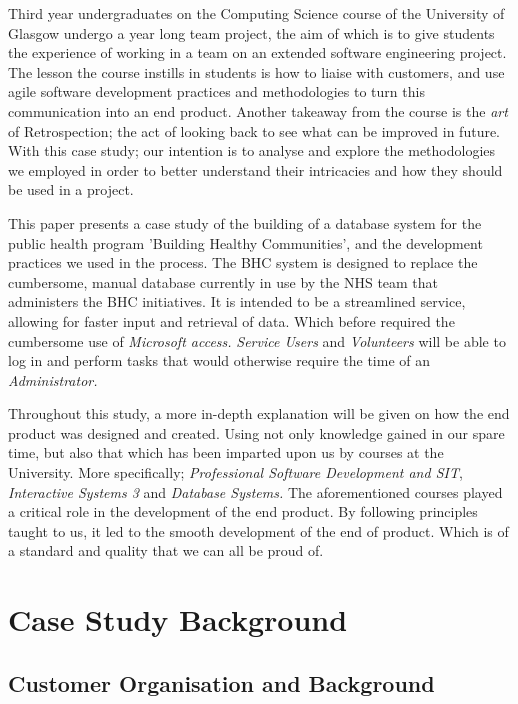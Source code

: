 \documentclass{l3proj}
\begin{document}
Third year undergraduates on the Computing Science course of the University of Glasgow undergo a year long team project, the aim of which is to give students the experience of working in a team on an extended software engineering project. The lesson the course instills in students is how to liaise with customers, and use agile software development practices and methodologies to turn this communication into an end product. Another takeaway from the course is the \textit{art} of Retrospection; the act of looking back to see what can be improved in future. With this case study; our intention is to analyse and explore the methodologies we employed in order to better understand their intricacies and how they should be used in a project.

This paper presents a case study of the building of a database system for the public health program 'Building Healthy Communities', and the development practices we used in the process. The BHC system is designed to replace the cumbersome, manual database currently in use by the NHS team that administers the BHC initiatives. It is intended to be a streamlined service, allowing for faster input and retrieval of data. Which before required the cumbersome use of \textit{Microsoft access.} \textit{Service Users} and \textit{Volunteers} will be able to log in and perform tasks that would otherwise require the time of an \textit{Administrator.}

Throughout this study, a more in-depth explanation will be given on how the end product was designed and created. Using not only knowledge gained in our spare time, but also that which has been imparted upon us by courses at the University. More specifically; \textit{Professional Software Development and SIT}, \textit{Interactive Systems 3} and \textit{Database Systems.} The aforementioned courses played a critical role in the development of the end product. By following principles taught to us, it led to the smooth development of the end of product. Which is of a standard and quality that we can all be proud of.
\section{Case Study Background}

\subsection{Customer Organisation and Background}
\label{customer}
\end{document}
